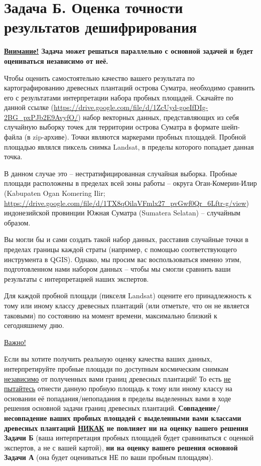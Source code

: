 \section{Задача Б. Оценка точности результатов дешифрирования}

\textbf{\underline{Внимание!} Задача может решаться параллельно с основной задачей и будет оцениваться независимо от неё.}

Чтобы оценить самостоятельно качество вашего результата по картографированию древесных плантаций острова Суматра, необходимо сравнить его с результатами интерпретации набора пробных площадей. Скачайте по данной ссылке (\url{https://drive.google.com/file/d/1ZcUyd-goeIfDIg-2BG_pxPJb2E9AvyfO/}) набор векторных данных, представляющих из себя случайную выборку точек для территории острова Суматра в формате шейп-файла (в zip-архиве). Точки являются маркерами пробных площадей. Пробной площадью являлся пиксель снимка Landsat, в пределы которого попадает данная точка.

В данном случае это – нестратифицированная случайная выборка. Пробные площади расположены в пределах всей зоны работы – округа Оган-Комерин-Илир \linebreak (Kabupaten Ogan Komering Ilir; \url{https://drive.google.com/file/d/1TX8qOilaVFmlx2}\linebreak \url{7_pvGwf0Qr_6Lftr-g/view}) индонезийской провинции Южная Суматра (Sumatera Selatan) – случайным образом.

Вы могли бы и сами создать такой набор данных, расставив случайные точки в пределах границы каждой страты (например, с помощью соответствующего инструмента в QGIS). Однако, мы просим вас воспользоваться именно этим, подготовленном нами набором данных – чтобы мы смогли сравнить ваши результаты с интерпретацией наших экспертов.

Для каждой пробной площади (пикселя Landsat) оцените его принадлежность к тому или иному классу древесных плантаций (или отметьте, что он не является таковыми) по состоянию на момент времени, максимально близкий к сегодняшнему дню.

\underline{Важно!}

Если вы хотите получить реальную оценку качества ваших данных, интерпретируйте пробные площади по доступным космическим снимкам \underline{независимо} от полученных вами границ древесных плантаций! То есть \underline{не пытайтесь} отнести данную пробную площадь к тому или иному классу на основании её попадания/непопадания в пределы выделенных вами в ходе решения основной задачи границ древесных плантаций. \textbf{Совпадение/несовпадение ваших пробных площадей с выделенными вами классами древесных плантаций \underline{НИКАК} не повлияет ни на оценку вашего решения Задачи Б} (ваша интерпретация пробных площадей будет сравниваться с оценкой экспертов, а не с вашей картой), \textbf{ни на оценку вашего решения основной Задачи А} (она будет оцениваться НЕ по ваши пробным площадям).

